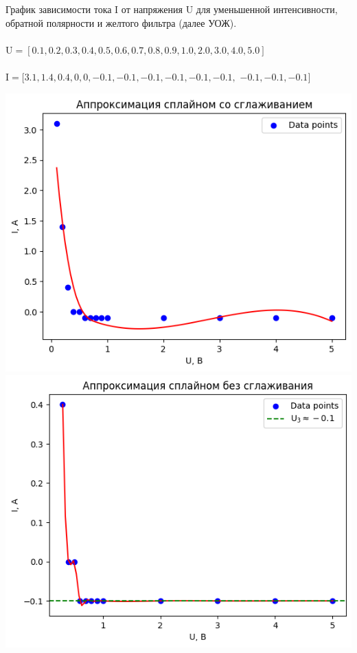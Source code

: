 \documentclass[12pt,openany]{book}
\begin{document}
\newpage

\noindent График зависимости тока I от напряжения U для уменьшенной интенсивности, 
обратной полярности и желтого фильтра (далее УОЖ).\\\\
$\text{U} = [0.1, 0.2, 0.3, 0.4, 0.5, 0.6, 0.7, 0.8, 0.9, 1.0, 2.0, 3.0, 4.0, 5.0]$\\\\
$\text{I} = [3.1, 1.4, 0.4, 0, 0, -0.1, -0.1, -0.1, -0.1, -0.1, -0.1,$
$-0.1, -0.1, -0.1]$\\

\begin{center}
    \includegraphics[scale=0.59]{9} \\

    \includegraphics[scale=0.59]{10} \\
\end{center}
\end{document}
